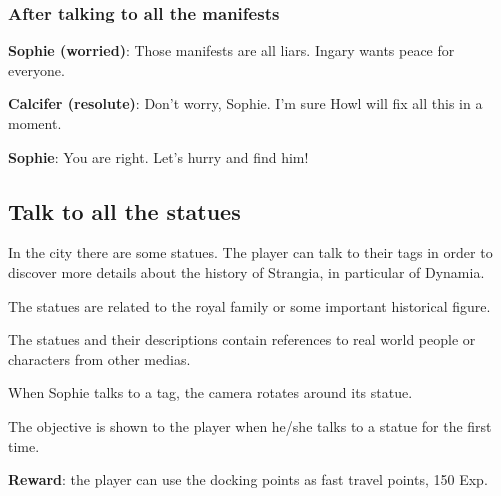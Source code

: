 %
%

\subsubsection*{After talking to all the manifests}
\textbf{Sophie (worried)}: Those manifests are all liars. Ingary wants peace for everyone.

\textbf{Calcifer (resolute)}: Don't worry, Sophie. I'm sure Howl will fix all this in a moment.

\textbf{Sophie}: You are right. Let's hurry and find him!


\subsection{Talk to all the statues}
In the city there are some statues. The player can talk to their tags in order to discover more details about the history of Strangia, in particular of Dynamia.

The statues are related to the royal family or some important historical figure.

The statues and their descriptions contain references to real world people or characters from other medias.

When Sophie talks to a tag, the camera rotates around its statue.

The objective is shown to the player when he/she talks to a statue for the first time.

\textbf{Reward}: the player can use the docking points as fast travel points, 150 Exp.

